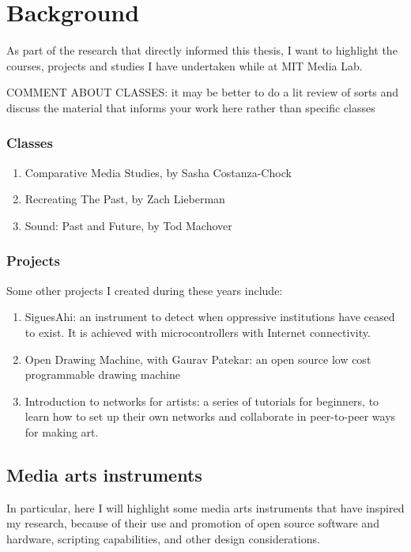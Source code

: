 \chapter{Background}

As part of the research that directly informed this thesis, I want to highlight the courses, projects and studies I have undertaken while at MIT Media Lab.

COMMENT ABOUT CLASSES: it may be better to do a lit review of sorts and discuss the material that informs your work here rather than specific classes

\subsection{Classes}

\begin{enumerate}
        \item Comparative Media Studies, by Sasha Costanza-Chock
        \item Recreating The Past, by Zach Lieberman
    \item Sound: Past and Future, by Tod Machover
\end{enumerate}

\subsection{Projects}

Some other projects I created during these years include:

\begin{enumerate}
        \item SiguesAhi: an instrument to detect when oppressive institutions have ceased to exist. It is achieved with microcontrollers with Internet connectivity.
        \item Open Drawing Machine, with Gaurav Patekar: an open source low cost programmable drawing machine
        \item Introduction to networks for artists: a series of tutorials for beginners, to learn how to set up their own networks and collaborate in peer-to-peer ways for making art.
\end{enumerate}


\section{Media arts instruments}

In particular, here I will highlight some media arts instruments that have inspired my research, because of their use and promotion of open source software and hardware, scripting capabilities, and other design considerations.

